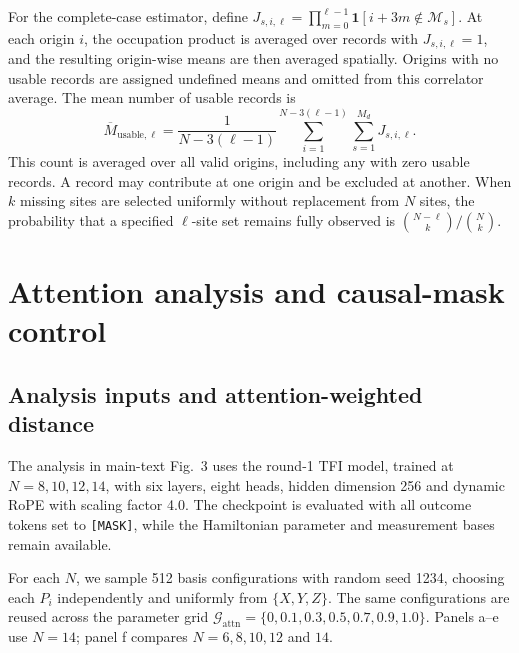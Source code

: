 \documentclass[11pt,a4paper]{article}
\newcommand{\TBD}[1]{\textcolor{red!70!black}{\textsf{[TBD: #1]}}}
\newcommand{\ind}{\mathbf{1}}
\newcommand{\sechead}[2]{\section{#2}}
\newcommand{\subhead}[1]{\subsection*{#1}}
\begin{document}
For the complete-case estimator, define
$J_{s,i,\ell}=\prod_{m=0}^{\ell-1}
\ind[i+3m\notin\mathcal{M}_s]$.
At each origin $i$, the occupation product is averaged over records
with $J_{s,i,\ell}=1$, and the resulting origin-wise means are then
averaged spatially. Origins with no usable records are assigned
undefined means and omitted from this correlator average. The mean
number of usable records is
\begin{equation}
\overline{M}_{\mathrm{usable},\ell}
=
\frac{1}{N-3(\ell-1)}
\sum_{i=1}^{N-3(\ell-1)}
\sum_{s=1}^{M_d}J_{s,i,\ell}.
\label{supp:eq:usable}
\end{equation}
This count is averaged over all valid origins, including any with
zero usable records. A record may contribute at one origin and be
excluded at another. When $k$ missing sites are selected uniformly
without replacement from $N$ sites, the probability that a specified
$\ell$-site set remains fully observed is
$\binom{N-\ell}{k}/\binom{N}{k}$.

\sechead{S5}{Attention analysis and causal-mask control}
\label{supp:attention}

\subhead{Analysis inputs and attention-weighted distance}
The analysis in main-text Fig.~3 uses the round-1 TFI model, trained at
$N=8,10,12,14$, with six layers, eight heads, hidden dimension 256 and
dynamic RoPE with scaling factor 4.0. The checkpoint is evaluated with
all outcome tokens set to \texttt{[MASK]}, while the Hamiltonian
parameter and measurement bases remain available.

For each $N$, we sample 512 basis configurations with random seed 1234,
choosing each $P_i$ independently and uniformly from $\{X,Y,Z\}$.
The same configurations are reused across the parameter grid
$\mathcal{G}_{\mathrm{attn}}=\{0,0.1,0.3,0.5,0.7,0.9,1.0\}$.
Panels a--e use $N=14$; panel f compares $N=6,8,10,12$ and $14$.
\end{document}
